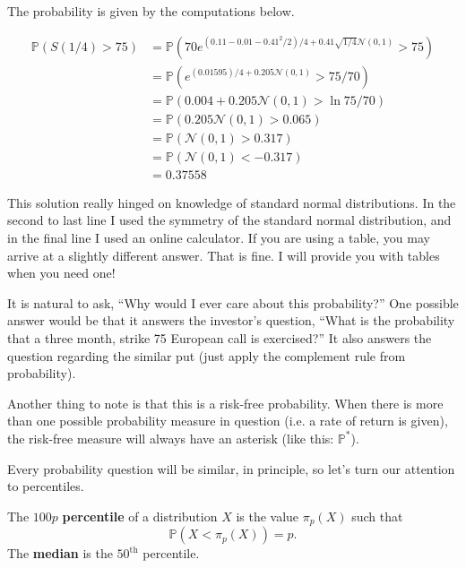 \documentclass{ximera}
\begin{document}
\begin{solution}
The probability is given by the computations below.

	\begin{align*}
	\mathbb{P}(S(1/4)>75) 	&=\mathbb{P}(70e^{(0.11-0.01-0.41^2/2)/4+0.41\sqrt{1/4}\mathcal{N}(0,1)}>75)\\
					&=\mathbb{P}(e^{(0.01595)/4+0.205\mathcal{N}(0,1)}>75/70)\\
					&=\mathbb{P}(0.004+0.205\mathcal{N}(0,1)>\ln75/70)\\
					&=\mathbb{P}(0.205\mathcal{N}(0,1)>0.065)\\
					&=\mathbb{P}(\mathcal{N}(0,1)>0.317)\\
					&=\mathbb{P}(\mathcal{N}(0,1)<-0.317)\\
					&=0.37558
	\end{align*}


This solution really hinged on knowledge of standard normal distributions. In the second to last line I used the symmetry of the standard normal distribution, and in the final line I used an online calculator. If you are using a table, you may arrive at a slightly different answer. That is fine. I will provide you with tables when you need one!

\end{solution}


It is natural to ask, ``Why would I ever care about this probability?'' One possible answer would be that it answers the investor's question, ``What is the probability that a three month, strike 75 European call is exercised?'' It also answers the question regarding the similar put (just apply the complement rule from probability). 

Another thing to note is that this is a risk-free probability. When there is more than one possible probability measure in question (i.e. a rate of return is given), the risk-free measure will always have an asterisk (like this: $\mathbb{P}^*$). 

Every probability question will be similar, in principle, so let's turn our attention to percentiles.

\begin{definition}
The $100p$ {\bf percentile} of a distribution $X$ is the value $\pi_p(X)$ such that
	\begin{equation*}
	\mathbb{P}(X<\pi_p(X))=p.
	\end{equation*}
The {\bf median} is the $50^{\text{th}}$ percentile.
\end{definition}
\end{document}
